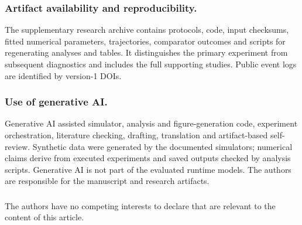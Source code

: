 \begin{credits}
\subsubsection{Artifact availability and reproducibility.}
The supplementary research archive contains protocols, code, input checksums, fitted numerical parameters, trajectories, comparator outcomes and scripts for regenerating analyses and tables. It distinguishes the primary experiment from subsequent diagnostics and includes the full supporting studies. Public event logs are identified by version-1 DOIs.
\subsubsection{Use of generative AI.}
Generative AI assisted simulator, analysis and figure-generation code, experiment orchestration, literature checking, drafting, translation and artifact-based self-review. Synthetic data were generated by the documented simulators; numerical claims derive from executed experiments and saved outputs checked by analysis scripts. Generative AI is not part of the evaluated runtime models. The authors are responsible for the manuscript and research artifacts.
\subsubsection{\discintname}
The authors have no competing interests to declare that are relevant to the content of this article.
\end{credits}

